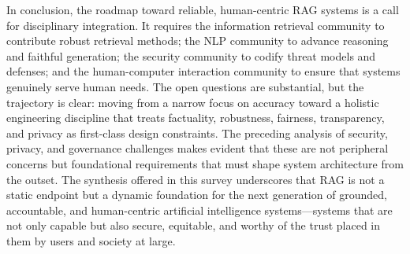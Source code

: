 \documentclass[11pt]{article}
\begin{document}
In conclusion, the roadmap toward reliable, human-centric RAG systems is a call for disciplinary integration. It requires the information retrieval community to contribute robust retrieval methods; the NLP community to advance reasoning and faithful generation; the security community to codify threat models and defenses; and the human-computer interaction community to ensure that systems genuinely serve human needs. The open questions are substantial, but the trajectory is clear: moving from a narrow focus on accuracy toward a holistic engineering discipline that treats factuality, robustness, fairness, transparency, and privacy as first-class design constraints. The preceding analysis of security, privacy, and governance challenges makes evident that these are not peripheral concerns but foundational requirements that must shape system architecture from the outset. The synthesis offered in this survey underscores that RAG is not a static endpoint but a dynamic foundation for the next generation of grounded, accountable, and human-centric artificial intelligence systems---systems that are not only capable but also secure, equitable, and worthy of the trust placed in them by users and society at large.
\end{document}

